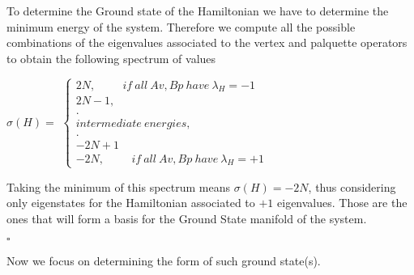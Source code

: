 \documentclass[12pt]{report}
\begin{document}
\begin{minipage}{1\textwidth}
	To determine the Ground state of the Hamiltonian we have to determine the minimum energy of the system. Therefore we compute all the possible combinations of the eigenvalues associated to the vertex and palquette operators to obtain the following spectrum of values\newline
	
	\begin{center}
		$\sigma( H) =$
		$\begin{cases}
			2N, \hspace{1cm} if \ all\ Av,Bp \ have \ \lambda_{H}= -1\\
			2N-1,\\
			.\\
			intermediate \ energies,\\
			.\\
			-2N+1\\
			-2N, \hspace{1cm} if \ all \ Av,Bp \ have \ \lambda_{H}= +1
		\end{cases}$
		\newline
	\end{center}
	
	Taking the minimum of this spectrum means $\sigma(H)=-2N$, thus considering only eigenstates for the Hamiltonian associated to $+1$ eigenvalues.\newline
	Those are the ones that will form a basis for the Ground State manifold of the system.\newline
	
	\hfill $\square$\newline
	
	
	Now we focus on determining the form of such ground state(s).\newline
	
\end{minipage}
\end{document}
